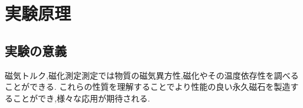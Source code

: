 \section{実験原理}
\subsection{実験の意義}
磁気トルク,磁化測定測定では物質の磁気異方性,磁化やその温度依存性を調べることができる.
これらの性質を理解することでより性能の良い永久磁石を製造することができ,様々な応用が期待される.


